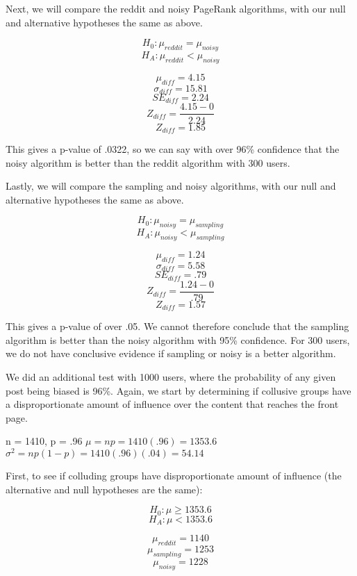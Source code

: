 \documentclass[12pt, oneside]{amsart}
\begin{document}
\vspace{.2cm}

Next, we will compare the reddit and noisy PageRank algorithms, with our null and alternative hypotheses the same as above.

$$H_0: \mu_{reddit} = \mu_{noisy}$$
$$H_A: \mu_{reddit} < \mu_{noisy}$$

$$\mu_{diff} = 4.15$$
$$\sigma_{diff} = 15.81$$
$$SE_{diff} = 2.24$$
$$Z_{diff} = \frac{4.15 - 0}{2.24}$$
$$Z_{diff} = 1.85$$

This gives a p-value of .0322, so we can say with over 96\% confidence that the noisy algorithm is better than the reddit algorithm with 300 users.

\vspace{.2cm}

Lastly, we will compare the sampling and noisy algorithms, with our null and alternative hypotheses the same as above.

$$H_0: \mu_{noisy} = \mu_{sampling}$$
$$H_A: \mu_{noisy} < \mu_{sampling}$$

$$\mu_{diff} = 1.24$$
$$\sigma_{diff} = 5.58$$
$$SE_{diff} = .79$$
$$Z_{diff}  = \frac{1.24 - 0}{.79}$$
$$Z_{diff} = 1.57$$

This gives a p-value of over .05.  We cannot therefore conclude that the sampling algorithm is better than the noisy algorithm with 95\% confidence.  For 300 users, we do not have conclusive evidence if sampling or noisy is a better algorithm.

\vspace{.4cm}

We did an additional test with 1000 users, where the probability of any given post being biased is 96\%.  Again, we start by determining if collusive groups have a disproportionate amount of influence over the content that reaches the front page.

\begin{center}
n = 1410, p = .96
$\mu = np = 1410 (.96) = 1353.6$ \\
$\sigma^2 = np(1 - p) = 1410 (.96)(.04) = 54.14$ \\
\end{center}

First, to see if colluding groups have disproportionate amount of influence (the alternative and null hypotheses are the same):

$$H_0: \mu \geq 1353.6$$
$$H_A: \mu < 1353.6$$

$$\mu_{reddit} = 1140$$
$$\mu_{sampling} = 1253$$
$$\mu_{noisy} = 1228$$
\end{document}
